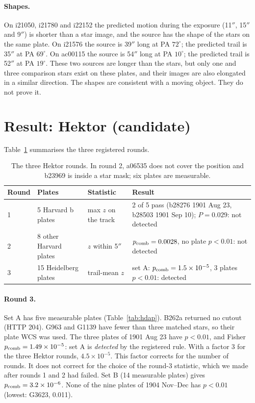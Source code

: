 \documentclass[11pt]{article}
\newcommand{\as}{$''$}
\begin{document}
\paragraph{Shapes.} On i21050, i21780 and i22152 the predicted motion during the exposure (11\as, 15\as{} and 9\as) is shorter than a star image, and the source has the shape of the stars on the same plate. On i21576 the source is 39\as{} long at PA $72^\circ$; the predicted trail is 35\as{} at PA $69^\circ$. On ac00115 the source is 54\as{} long at PA $10^\circ$; the predicted trail is 52\as{} at PA $19^\circ$. These two sources are longer than the stars, but only one and three comparison stars exist on these plates, and their images are also elongated in a similar direction. The shapes are consistent with a moving object. They do not prove it.

\section{Result: Hektor (candidate)}
Table~\ref{tab:rounds} summarises the three registered rounds.

\begin{table}[h]
\centering\small
\begin{tabular}{lp{3.2cm}p{2.4cm}p{7.2cm}}\toprule
Round & Plates & Statistic & Result \\\midrule
1 & 5 Harvard b plates & max $z$ on the track & 2 of 5 pass (b28276 1901 Aug 23, b28503 1901 Sep 10); $P=0.029$: not detected \\
2 & 8 other Harvard plates & $z$ within 5\as{} & $p_{\rm comb}=0.0028$, no plate $p<0.01$: not detected \\
3 & 15 Heidelberg plates & trail-mean $z$ & set A: $p_{\rm comb}=1.5\times10^{-5}$, 3 plates $p<0.01$: detected \\\bottomrule
\end{tabular}
\caption{The three Hektor rounds. In round 2, a06535 does not cover the position and b23969 is inside a star mask; six plates are measurable.}
\label{tab:rounds}
\end{table}

\paragraph{Round 3.} Set A has five measurable plates (Table~\ref{tab:hdap}). B262a returned no cutout (HTTP 204). G963 and G1139 have fewer than three matched stars, so their plate WCS was used. The three plates of 1901 Aug 23 have $p<0.01$, and Fisher $p_{\rm comb}=1.49\times10^{-5}$: set A is \emph{detected} by the registered rule. With a factor 3 for the three Hektor rounds, $4.5\times10^{-5}$. This factor corrects for the number of rounds. It does not correct for the choice of the round-3 statistic, which we made after rounds 1 and 2 had failed. Set B (14 measurable plates) gives $p_{\rm comb}=3.2\times10^{-6}$. None of the nine plates of 1904 Nov--Dec has $p<0.01$ (lowest: G3623, 0.011).
\end{document}
